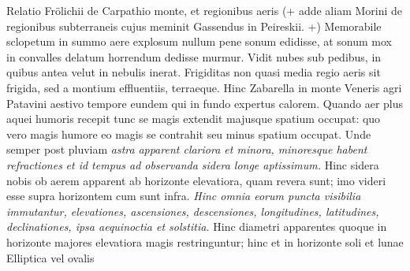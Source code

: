  \pstart {} Relatio Fr\"{o}lichii\protect{} de Carpathio monte\protect{}, et regionibus aeris (+ adde aliam Morini\protect{} de regionibus subterraneis cujus meminit Gassendus\protect{} in  Peireskii\protect{}. +) Memorabile sclopetum\protect{} in summo aere explosum nullum pene sonum\protect{} edidisse, at sonum\protect{} mox in convalles delatum horrendum dedisse murmur. Vidit nubes sub pedibus, in quibus antea velut in nebulis inerat.\pend \pstart {} Frigiditas non  quasi media regio aeris sit frigida, sed a montium effluentiis, terraeque\protect{}. Hinc Zabarella\protect{} in monte Veneris agri Patavini aestivo tempore eundem qui in fundo expertus calorem\protect{}.\pend \pstart {} Quando aer plus aquei humoris recepit tunc se magis extendit majusque spatium occupat: quo vero magis humore  eo magis se contrahit seu minus spatium occupat. Unde semper post pluviam \textit{astra}\protect{}\textit{ apparent clariora et minora, minoresque habent }\textit{refractiones}\protect{}\textit{ et id tempus ad observanda sidera longe aptissimum.} Hinc sidera nobis ob aerem apparent ab horizonte elevatiora, quam revera sunt; imo videri esse supra horizontem cum sunt infra. \textit{Hinc omnia eorum puncta visibilia immutantur, elevationes, ascensiones, descensiones, longitudines, latitudines, declinationes, ipsa aequinoctia et solstitia.} Hinc diametri apparentes quoque in horizonte majores  elevatiora magis restringuntur; hinc et in horizonte soli\protect{} et lunae\protect{} Elliptica vel ovalis 